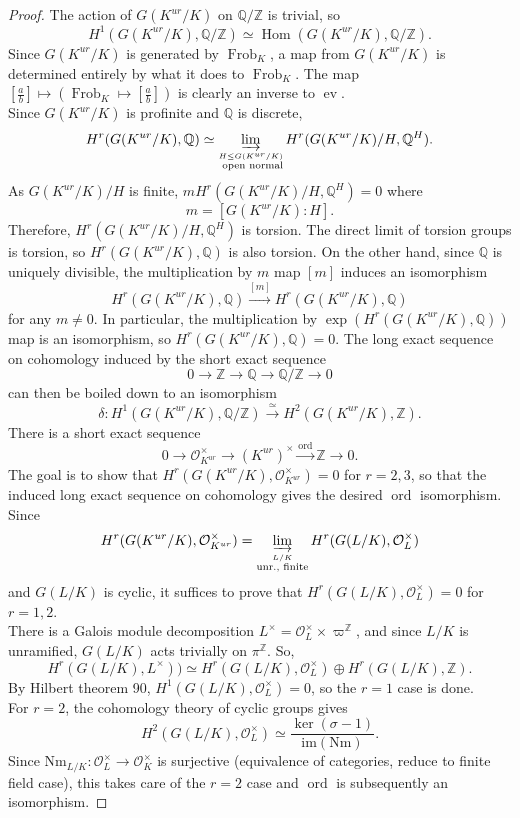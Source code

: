 \documentclass[class=article, crop=false]{standalone}
\newcommand{\ZZ}{\mathbb{Z}}
\newcommand{\QQ}{\mathbb{Q}}
\newcommand{\Hom}{\operatorname{Hom}}
\newcommand{\Frob}{\operatorname{Frob}}
\newcommand{\ord}{\operatorname{ord}}
\newcommand{\ev}{\operatorname{ev}}
\newcommand{\Nm}{\mathrm{Nm}}
\newcommand{\im}{\mathrm{im}}
\theoremstyle{definition}
\begin{document}
\begin{proof}
	The action of $G(K^{ur}/K)$ on $\QQ/\ZZ$ is trivial, so
	\[
	H^{1}(G(K^{ur}/K),\QQ/\ZZ)\simeq\Hom(G(K^{ur}/K),\QQ/\ZZ)
	.\] 
	Since $G(K^{ur}/K)$ is generated by $\Frob_K$, a map from $G(K^{ur}/K)$ is determined entirely by what it does to $\Frob_K$. The map $\left[\frac{a}{b}\right]\mapsto(\Frob_K\mapsto\left[\frac{a}{b}\right])$ is clearly an inverse to $\ev$.\\
	Since $G(K^{ur}/K)$ is profinite and $\QQ$ is discrete,
	\[
		H^{r}(G(K^{ur}/K),\QQ)\simeq\varinjlim_{\stackrel{H\le G(K^{ur}/K)}{\text{ open normal}}}H^{r}(G(K^{ur}/K)/H,\QQ^{H})
	.\] 
	As $G(K^{ur}/K)/H$ is finite, $mH^{r}(G(K^{ur}/K)/H,\QQ^{H})=0$ where
	\[
	m=[G(K^{ur}/K):H]
	.\] 
	Therefore, $H^{r}(G(K^{ur}/K)/H,\QQ^{H})$ is torsion. The direct limit of torsion groups is torsion, so $H^{r}(G(K^{ur}/K),\QQ)$ is also torsion. On the other hand, since $\QQ$ is uniquely divisible, the multiplication by $m$ map $[m]$ induces an isomorphism
	\[
		H^{r}(G(K^{ur}/K),\QQ)\xrightarrow{[m]}H^{r}(G(K^{ur}/K),\QQ)
	\] 
	for any $m\ne 0$. In particular, the multiplication by $\exp(H^{r}(G(K^{ur}/K),\QQ))$  map is an isomorphism, so $H^{r}(G(K^{ur}/K),\QQ)=0$. The long exact sequence on cohomology induced by the short exact sequence
	\[
		0\to\ZZ\to\QQ\to\QQ/\ZZ\to 0
	\] 
	can then be boiled down to an isomorphism
	\[
		\delta:H^{1}(G(K^{ur}/K),\QQ/\ZZ)\xrightarrow{\simeq}H^{2}(G(K^{ur}/K),\ZZ)
	.\] 
	There is a short exact sequence
	\[
		0\to\mathcal{O}_{K^{ur}}^{\times}\to(K^{ur})^{\times}\xrightarrow{\ord}\ZZ\to 0
	.\] 
	The goal is to show that $H^{r}(G(K^{ur}/K),\mathcal{O}_{K^{ur}}^{\times})=0$ for $r=2,3$, so that the induced long exact sequence on cohomology gives the desired $\ord$ isomorphism. Since
	\[
		H^{r}(G(K^{ur}/K),\mathcal{O}_{K^{ur}}^{\times})=\varinjlim_{\stackrel{L/K}{\text{unr., finite}}}H^{r}(G(L/K),\mathcal{O}_L^{\times})
	\] 
	and $G(L/K)$ is cyclic, it suffices to prove that $H^{r}(G(L/K),\mathcal{O}_L^{\times})=0$ for $r=1,2$.\\
	There is a Galois module decomposition $L^{\times}=\mathcal{O}_L^{\times}\times\varpi^{\ZZ}$, and since $L/K$ is unramified, $G(L/K)$ acts trivially on $\pi^{\ZZ}$. So,
	\[
		H^{r}(G(L/K),L^{\times}))\simeq H^{r}(G(L/K),\mathcal{O}_L^{\times})\oplus H^{r}(G(L/K),\ZZ)
	.\] 
	By Hilbert theorem 90, $H^{1}(G(L/K),\mathcal{O}_L^{\times})=0$, so the $r=1$ case is done.\\
	For $r=2$, the cohomology theory of cyclic groups gives
	\[
		H^{2}(G(L/K),\mathcal{O}_L^{\times})\simeq\frac{\ker(\sigma-1)}{\im(\Nm)}
	.\] 
	Since $\Nm_{L/K}:\mathcal{O}_L^{\times}\to\mathcal{O}_K^{\times}$ is surjective (equivalence of categories, reduce to finite field case), this takes care of the $r=2$ case and $\ord$ is subsequently an isomorphism.
\end{proof}
\end{document}

